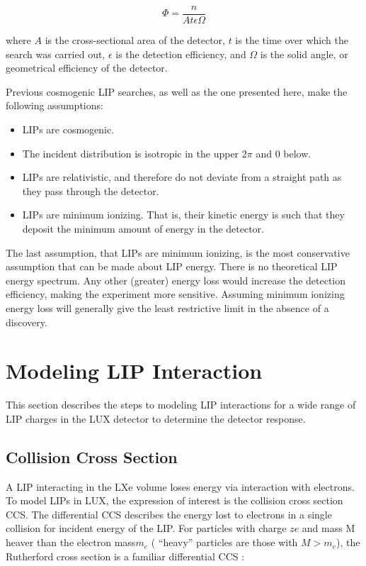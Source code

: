 \begin{equation}
\label{eq:flux}
\Phi = \frac{n}{A t \epsilon \Omega}
\end{equation}

where $A$ is the cross-sectional area of the detector, $t$ is the time over which the search was carried out, $\epsilon$ is the detection efficiency, and $\Omega$ is the solid angle, or geometrical efficiency of the detector.

Previous cosmogenic \ac{LIP} searches, as well as the one presented here, make the following assumptions:

\begin{itemize}
\item \ac{LIP}s are cosmogenic.
\item The incident distribution is isotropic in the upper 2$\pi$ and 0 below.
\item \ac{LIP}s are relativistic, and therefore do not deviate from a straight path as they pass through the detector.
\item \ac{LIP}s are minimum ionizing. That is, their kinetic energy is such that they deposit the minimum amount of energy in the detector.
\end{itemize}

The last assumption, that \ac{LIP}s are minimum ionizing, is the most conservative assumption that can be made about \ac{LIP} energy. There is no theoretical \ac{LIP} energy spectrum. Any other (greater) energy loss would increase the detection efficiency, making the experiment more sensitive. Assuming minimum ionizing energy loss will generally give the least restrictive limit in the absence of a discovery.


\section{Modeling LIP Interaction}
This section describes the steps to modeling \ac{LIP} interactions for a wide range of \ac{LIP} charges in the \ac{LUX} detector to determine the detector response. 

\subsection{Collision Cross Section}
A \ac{LIP} interacting in the \ac{LXe} volume loses energy via interaction with electrons.  To model \ac{LIP}s in \ac{LUX}, the expression of interest is the collision cross section \ac{CCS}. The differential \ac{CCS} describes the energy lost to electrons in a single collision for incident energy of the LIP. For particles with charge $ze$ and mass M heaver than the electron mass$ m_{e}$ ( ``heavy'' particles are those with $M > m_{e}$), the Rutherford cross section is a familiar differential \ac{CCS} \cite{PDG}:

